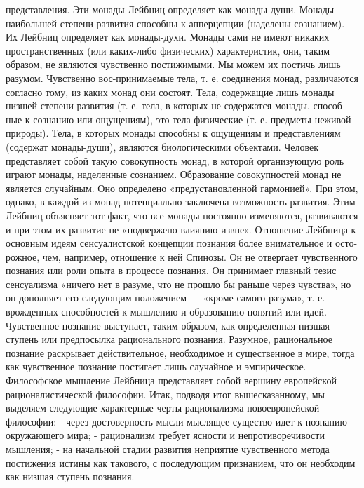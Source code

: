 \documentclass[12pt]{article}
\begin{document}
представления. Эти монады Лейбниц определяет как монады-души. Монады наибольшей степени развития
способны к апперцепции (наделены сознанием). Их Лейбниц определяет как монады-духи.
Монады сами не имеют никаких пространственных (или каких-либо физических) характеристик, они, таким
образом,  не  являются  чувственно  постижимыми.  Мы  можем  их  постичь  лишь  разумом.  Чувственно  вос-принимаемые тела, т. е. соединения монад, различаются согласно тому, из каких монад они состоят. Тела,
содержащие лишь монады низшей степени развития (т. е. тела, в которых не содержатся монады, способ ные к
сознанию или ощущениям),-это тела физические (т. е. предметы неживой природы). Тела, в которых монады
способны к ощущениям и представлениям (содержат монады-души), являются биологическими объектами.
Человек  представляет  собой  такую  совокупность  монад,  в  которой  организующую  роль  играют  монады,
наделенные  сознанием.  Образование  совокупностей  монад  не  является  случайным.  Оно  определено
«предустановленной гармонией». При этом, однако, в каждой из монад потенциально заключена возможность
развития. Этим Лейбниц объясняет тот факт, что все монады постоянно изменяются, развиваются и при этом их 
развитие не «подвержено влиянию извне».
Отношение Лейбница к основным идеям сенсуалистской концепции познания более внимательное и осто-рожное, чем, например, отношение к ней Спинозы. Он не отвергает чувственного познания или роли опыта в
процессе познания. Он принимает главный тезис сенсуализма «ничего нет в разуме, что не прошло бы раньше
через чувства», но он дополняет его следующим положением — «кроме самого разума», т. е. врожденных
способностей к мышлению и образованию понятий или идей.
Чувственное  познание  выступает,  таким  образом,  как  определенная  низшая  ступень  или  предпосылка
рационального  познания.  Разумное,  рациональное  познание  раскрывает  действительное,  необходимое  и
существенное в мире, тогда как чувственное познание постигает лишь случайное и эмпирическое.
Философское мышление Лейбница представляет собой вершину европейской рационалистической философии.
Итак,  подводя  итог  вышесказанному,  мы  выделяем  следующие  характерные  черты  рационализма
новоевропейской философии:
- через достоверность мысли мыслящее существо идет к познанию окружающего мира;
- рационализм требует ясности и непротиворечивости мышления;
-  на  начальной  стадии  развития  неприятие  чувственного  метода  постижения  истины  как  такового,  с
последующим признанием, что он необходим как низшая ступень познания.


\newpage
\end{document}
